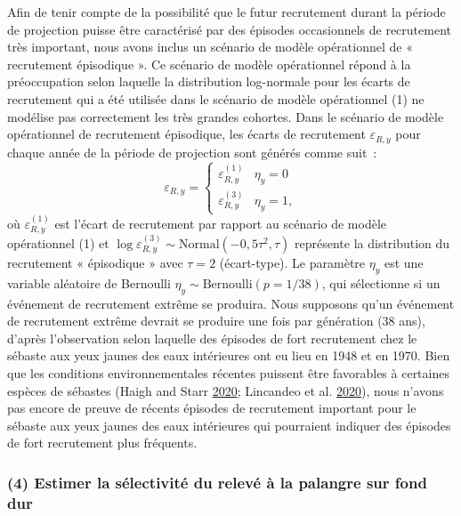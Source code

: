 \documentclass[11pt]{book}
\begin{document}
Afin de tenir compte de la possibilité que le futur recrutement durant la période de projection puisse être caractérisé par des épisodes occasionnels de recrutement très important, nous avons inclus un scénario de modèle opérationnel de « recrutement épisodique ». Ce scénario de modèle opérationnel répond à la préoccupation selon laquelle la distribution log-normale pour les écarts de recrutement qui a été utilisée dans le scénario de modèle opérationnel (1) ne modélise pas correctement les très grandes cohortes. Dans le scénario de modèle opérationnel de recrutement épisodique, les écarts de recrutement \(\varepsilon_{R,y}\) pour chaque année de la période de projection sont générés comme suit~:
\begin{equation}
\varepsilon_{R,y} = 
\left\{
\begin{array}{ll}
\varepsilon^{(1)}_{R,y} & \eta_y = 0\\
\varepsilon^{(3)}_{R,y} & \eta_y = 1,
\end{array}
\right.
\end{equation}
où \(\varepsilon^{(1)}_{R,y}\) est l'écart de recrutement par rapport au scénario de modèle opérationnel (1) et \(\log\varepsilon^{(3)}_{R,y} \sim \textrm{Normal}(-0,5\tau^2, \tau)\) représente la distribution du recrutement « épisodique » avec \(\tau = 2\) (écart-type). Le paramètre \(\eta_y\) est une variable aléatoire de Bernoulli \(\eta_y \sim \textrm{Bernoulli}(p = 1/38)\), qui sélectionne si un événement de recrutement extrême se produira. Nous supposons qu'un événement de recrutement extrême devrait se produire une fois par génération (38 ans), d'après l'observation selon laquelle des épisodes de fort recrutement chez le sébaste aux yeux jaunes des eaux intérieures ont eu lieu en 1948 et en 1970. Bien que les conditions environnementales récentes puissent être favorables à certaines espèces de sébastes (Haigh and Starr \protect\hyperlink{ref-haigh2020}{2020}; Lincandeo et al. \protect\hyperlink{ref-lincandeo2020}{2020}), nous n'avons pas encore de preuve de récents épisodes de recrutement important pour le sébaste aux yeux jaunes des eaux intérieures qui pourraient indiquer des épisodes de fort recrutement plus fréquents.

\hypertarget{sec:approach3-reference4}{%
\subsubsection{(4) Estimer la sélectivité du relevé à la palangre sur fond dur}\label{sec:approach3-reference4}}
\end{document}
